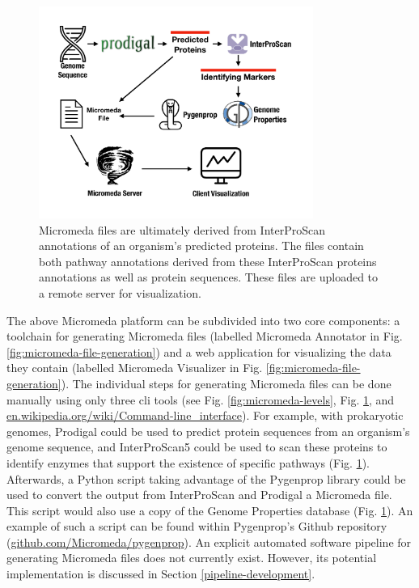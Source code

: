 \begin{figure}[!ht]
  \centering
	\includegraphics[width=0.8\textwidth]{media/how-micromeda-files-are-built.pdf}
	 \caption{Micromeda files are ultimately derived from InterProScan annotations of an organism's predicted proteins. The files contain both pathway annotations derived from these InterProScan proteins annotations as well as protein sequences. These files are uploaded to a remote server for visualization.}
	 \label{fig:micromeda-file-building-and-use}
\end{figure}

The above Micromeda platform can be subdivided into two core components: a toolchain for generating Micromeda files (labelled Micromeda Annotator in Fig. \ref{fig:micromeda-file-generation}) and a web application for visualizing the data they contain (labelled Micromeda Visualizer in Fig. \ref{fig:micromeda-file-generation}). The individual steps for generating Micromeda files can be done manually using only three \gls{cli} tools (see Fig. \ref{fig:micromeda-levels}, Fig. \ref{fig:micromeda-file-building-and-use}, and  \href{en.wikipedia.org/wiki/Command-line\_interface}{en.wikipedia.org/wiki/Command-line\_interface}). For example, with prokaryotic genomes, Prodigal could be used to predict protein sequences from an organism's genome sequence, and InterProScan5 could be used to scan these proteins to identify enzymes that support the existence of specific pathways (Fig. \ref{fig:micromeda-file-building-and-use}). Afterwards, a Python script taking advantage of the Pygenprop library could be used to convert the output from InterProScan and Prodigal a Micromeda file. This script would also use a copy of the Genome Properties database (Fig. \ref{fig:micromeda-file-building-and-use}). An example of such a script can be found within Pygenprop's Github repository (\href{github.com/Micromeda/pygenprop}{github.com/Micromeda/pygenprop}). An explicit automated software pipeline for generating Micromeda files does not currently exist. However, its potential implementation is discussed in Section \ref{pipeline-development}.

